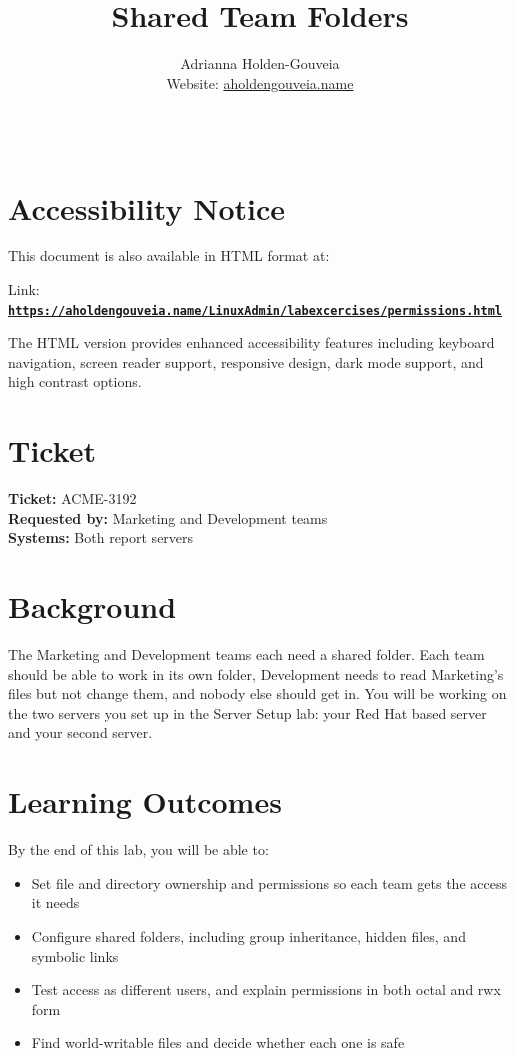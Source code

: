 \documentclass[12pt]{article}
\title{Shared Team Folders}
\author{
        Adrianna Holden-Gouveia \\
        Website: \href{https://aholdengouveia.name}{aholdengouveia.name}\\ 
        \date{\vspace{-5ex}}
        \faGithub {: aholdengouveia} \\
        }
\begin{document}
    

\maketitle



\section*{Accessibility Notice}
This document is also available in HTML format at:

Link: \href{https://aholdengouveia.name/LinuxAdmin/labexcercises/permissions.html}{\textbf{\nolinkurl{https://aholdengouveia.name/LinuxAdmin/labexcercises/permissions.html}}}

The HTML version provides enhanced accessibility features including keyboard navigation, screen reader support, responsive design, dark mode support, and high contrast options.


\section*{Ticket}
\noindent\textbf{Ticket:} ACME-3192\\
\textbf{Requested by:} Marketing and Development teams\\
\textbf{Systems:} Both report servers

\section*{Background}
The Marketing and Development teams each need a shared folder. Each team should be able to work in its own folder, Development needs to read Marketing's files but not change them, and nobody else should get in. You will be working on the two servers you set up in the Server Setup lab: your Red Hat based server and your second server.

\section*{Learning Outcomes}
By the end of this lab, you will be able to:
\begin{itemize}
    \item Set file and directory ownership and permissions so each team gets the access it needs
    \item Configure shared folders, including group inheritance, hidden files, and symbolic links
    \item Test access as different users, and explain permissions in both octal and rwx form
    \item Find world-writable files and decide whether each one is safe
\end{itemize}
\end{document}
